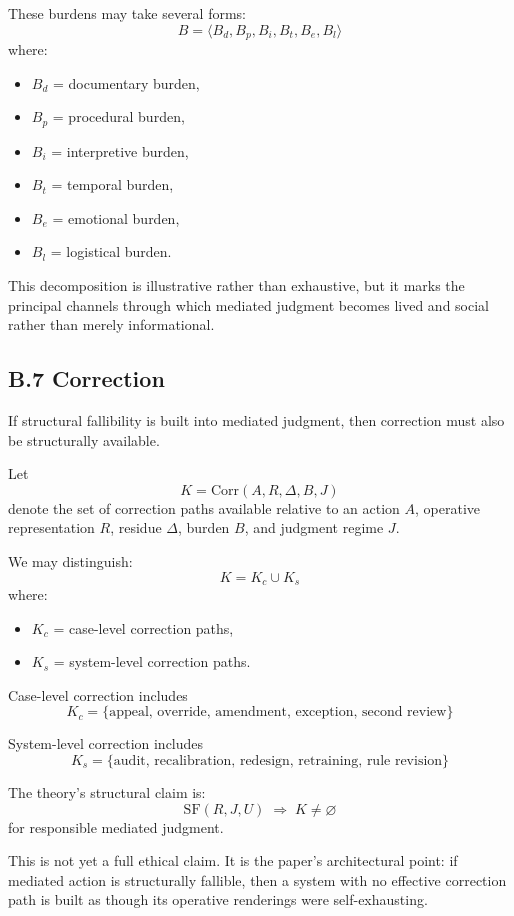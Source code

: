 \documentclass[11pt]{article}
\begin{document}
These burdens may take several forms:
\[
B = \langle B_d, B_p, B_i, B_t, B_e, B_l \rangle
\]
where:
\begin{itemize}
    \item \(B_d\) = documentary burden,
    \item \(B_p\) = procedural burden,
    \item \(B_i\) = interpretive burden,
    \item \(B_t\) = temporal burden,
    \item \(B_e\) = emotional burden,
    \item \(B_l\) = logistical burden.
\end{itemize}

This decomposition is illustrative rather than exhaustive, but it marks the principal channels through which mediated judgment becomes lived and social rather than merely informational.

\subsection*{B.7 Correction}

If structural fallibility is built into mediated judgment, then correction must also be structurally available.

Let
\[
K = \mathrm{Corr}(A,R,\Delta,B,J)
\]
denote the set of correction paths available relative to an action \(A\), operative representation \(R\), residue \(\Delta\), burden \(B\), and judgment regime \(J\).

We may distinguish:
\[
K = K_c \cup K_s
\]
where:
\begin{itemize}
    \item \(K_c\) = case-level correction paths,
    \item \(K_s\) = system-level correction paths.
\end{itemize}

Case-level correction includes
\[
K_c = \{\text{appeal, override, amendment, exception, second review}\}
\]

System-level correction includes
\[
K_s = \{\text{audit, recalibration, redesign, retraining, rule revision}\}
\]

The theory's structural claim is:
\[
\mathrm{SF}(R,J,U) \;\Rightarrow\; K \neq \varnothing
\]
for responsible mediated judgment.

This is not yet a full ethical claim. It is the paper's architectural point: if mediated action is structurally fallible, then a system with no effective correction path is built as though its operative renderings were self-exhausting.
\end{document}
